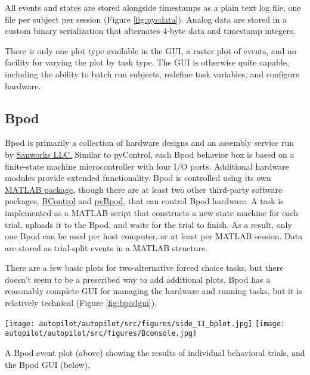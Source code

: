 All events and states are stored alongside timestamps as a plain text log file, one file per subject per session (Figure \ref{fig:pycdata}). Analog data are stored in a custom binary serialization that alternates 4-byte data and timestamp integers.

There is only one plot type available in the GUI, a raster plot of events, and no facility for varying the plot by task type. The GUI is otherwise quite capable, including the ability to batch run subjects, redefine task variables, and configure hardware.\\

\subsection{Bpod}

Bpod is primarily a collection of hardware designs and an assembly service run by \href{https://www.sanworks.io/about/about.php}{Sanworks LLC.} Similar to pyControl, each Bpod behavior box is based on a finite-state machine microcontroller with four I/O ports. Additional hardware modules provide extended functionality. Bpod is controlled using its own \href{https://github.com/sanworks/Bpod_Gen2}{MATLAB package}, though there are at least two other third-party software packages, \href{https://brodylabwiki.princeton.edu/bcontrol/index.php/Main_Page}{BControl} and \href{https://pybpod.github.io/}{pyBpod}, that can control Bpod hardware. A task is implemented as a MATLAB script that constructs a new state machine for each trial, uploads it to the Bpod, and waits for the trial to finish. As a result, only one Bpod can be used per host computer, or at least per MATLAB session. Data are stored as trial-split events in a MATLAB structure.

There are a few basic plots for two-alternative forced choice tasks, but there doesn't seem to be a prescribed way to add additional plots. Bpod has a reasonably complete GUI for managing the hardware and running tasks, but it is relatively technical (Figure \ref{fig:bpodgui}).

\begin{marginfigure}
\noindent\texttt{[image: autopilot/autopilot/src/figures/side\_11\_bplot.jpg]}
\texttt{[image: autopilot/autopilot/src/figures/Bconsole.jpg]}
\caption{A Bpod event plot (above) showing the results of individual behavioral trials, and the Bpod GUI (below).} 
\label{fig:bpodgui}
\end{marginfigure}


